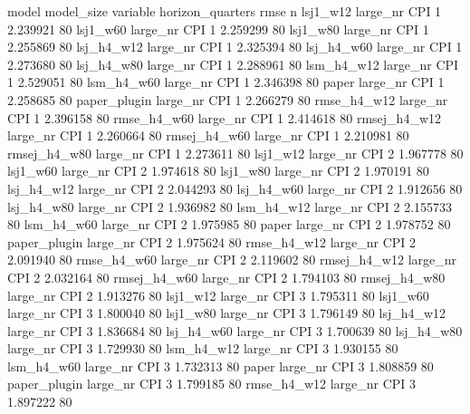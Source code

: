        model model_size variable  horizon_quarters     rmse  n
    lsj1_w12   large_nr      CPI                 1 2.239921 80
    lsj1_w60   large_nr      CPI                 1 2.259299 80
    lsj1_w80   large_nr      CPI                 1 2.255869 80
  lsj_h4_w12   large_nr      CPI                 1 2.325394 80
  lsj_h4_w60   large_nr      CPI                 1 2.273680 80
  lsj_h4_w80   large_nr      CPI                 1 2.288961 80
  lsm_h4_w12   large_nr      CPI                 1 2.529051 80
  lsm_h4_w60   large_nr      CPI                 1 2.346398 80
       paper   large_nr      CPI                 1 2.258685 80
paper_plugin   large_nr      CPI                 1 2.266279 80
 rmse_h4_w12   large_nr      CPI                 1 2.396158 80
 rmse_h4_w60   large_nr      CPI                 1 2.414618 80
rmsej_h4_w12   large_nr      CPI                 1 2.260664 80
rmsej_h4_w60   large_nr      CPI                 1 2.210981 80
rmsej_h4_w80   large_nr      CPI                 1 2.273611 80
    lsj1_w12   large_nr      CPI                 2 1.967778 80
    lsj1_w60   large_nr      CPI                 2 1.974618 80
    lsj1_w80   large_nr      CPI                 2 1.970191 80
  lsj_h4_w12   large_nr      CPI                 2 2.044293 80
  lsj_h4_w60   large_nr      CPI                 2 1.912656 80
  lsj_h4_w80   large_nr      CPI                 2 1.936982 80
  lsm_h4_w12   large_nr      CPI                 2 2.155733 80
  lsm_h4_w60   large_nr      CPI                 2 1.975985 80
       paper   large_nr      CPI                 2 1.978752 80
paper_plugin   large_nr      CPI                 2 1.975624 80
 rmse_h4_w12   large_nr      CPI                 2 2.091940 80
 rmse_h4_w60   large_nr      CPI                 2 2.119602 80
rmsej_h4_w12   large_nr      CPI                 2 2.032164 80
rmsej_h4_w60   large_nr      CPI                 2 1.794103 80
rmsej_h4_w80   large_nr      CPI                 2 1.913276 80
    lsj1_w12   large_nr      CPI                 3 1.795311 80
    lsj1_w60   large_nr      CPI                 3 1.800040 80
    lsj1_w80   large_nr      CPI                 3 1.796149 80
  lsj_h4_w12   large_nr      CPI                 3 1.836684 80
  lsj_h4_w60   large_nr      CPI                 3 1.700639 80
  lsj_h4_w80   large_nr      CPI                 3 1.729930 80
  lsm_h4_w12   large_nr      CPI                 3 1.930155 80
  lsm_h4_w60   large_nr      CPI                 3 1.732313 80
       paper   large_nr      CPI                 3 1.808859 80
paper_plugin   large_nr      CPI                 3 1.799185 80
 rmse_h4_w12   large_nr      CPI                 3 1.897222 80
